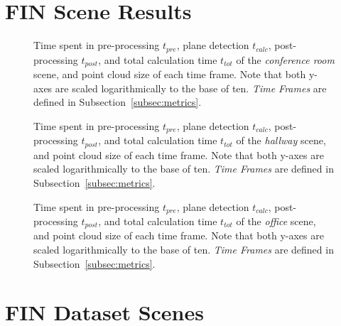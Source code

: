 \documentclass[main.tex]{subfiles}
\begin{document}
\appendix
\chapter{FIN Scene Results}
\setcounter{page}{\thepage-1}
\label{app:fin}

\begin{figure}[H]
    \centering
    \def\svgwidth{0.7\textwidth}
    
    \caption[Time Results Conference Room Scene]{Time spent in pre-processing $t_{pre}$, plane detection $t_{calc}$, post-processing
        $t_{post}$, and total calculation time $t_{tot}$ of the \textit{conference room} scene, and point cloud size of each time frame.
        Note that both y-axes are scaled logarithmically to the base of ten. \textit{Time Frames} are defined in Subsection~\ref{subsec:metrics}.}
    \label{fig:dynconf}
\end{figure}

\begin{figure}[H]
    \centering
    \def\svgwidth{0.7\textwidth}
    
    \caption[Time Results Hallway Scene]{Time spent in pre-processing $t_{pre}$, plane detection $t_{calc}$, post-processing
        $t_{post}$, and total calculation time $t_{tot}$ of the \textit{hallway} scene, and point cloud size of each time frame.
        Note that both y-axes are scaled logarithmically to the base of ten. \textit{Time Frames} are defined in Subsection~\ref{subsec:metrics}.}
    \label{fig:dynhallway}
\end{figure}

\begin{figure}[p]
    \centering
    \def\svgwidth{0.7\textwidth}
    
    \caption[Time Results Office Scene]{Time spent in pre-processing $t_{pre}$, plane detection $t_{calc}$, post-processing
        $t_{post}$, and total calculation time $t_{tot}$ of the \textit{office} scene, and point cloud size of each time frame.
        Note that both y-axes are scaled logarithmically to the base of ten. \textit{Time Frames} are defined in Subsection~\ref{subsec:metrics}.}
    \label{fig:dynoff}
\end{figure}

\chapter{FIN Dataset Scenes}
\label{app:fin-scenes}
\end{document}

